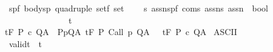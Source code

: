 \begin{isabellebody}
\ \ {\isachardoublequoteopen}{\isacharbrackleft}{\isacharparenleft}{\isacharprime}s{\isacharcomma}{\isacharprime}p{\isacharcomma}{\isacharprime}f{\isacharparenright}\ body{\isacharcomma}{\isacharparenleft}{\isacharprime}s{\isacharcomma}{\isacharprime}p{\isacharparenright}\ quadruple\ set{\isacharcomma}{\isacharprime}f\ set{\isacharcomma}\isanewline
\ \ \ \ {\isacharprime}s\ assn{\isacharcomma}{\isacharparenleft}{\isacharprime}s{\isacharcomma}{\isacharprime}p{\isacharcomma}{\isacharprime}f{\isacharparenright}\ com{\isacharcomma}{\isacharprime}s\ assn{\isacharcomma}{\isacharprime}s\ assn{\isacharbrackright}\ {\isasymRightarrow}\ bool{\isachardoublequoteclose}\isanewline
\ \ \ \ \ \ \ \ \ \ \ \ \ \ \ \ {\isacharparenleft}{\isachardoublequoteopen}{\isacharunderscore}{\isacharcomma}{\isacharunderscore}{\isasymTurnstile}\isactrlsub t\isactrlbsub {\isacharprime}{\isacharslash}{\isacharunderscore}\isactrlesub {\isacharslash}\ {\isacharunderscore}\ {\isacharunderscore}\ {\isacharunderscore}{\isacharcomma}{\isacharunderscore}{\isachardoublequoteclose}\ \ {\isacharbrackleft}{}{}{\isacharcomma}{}{}{\isacharcomma}\ {}{}{\isacharcomma}{}{}{}{}{\isacharcomma}\ {}{}{\isacharcomma}\ {}{}{}{}{\isacharcomma}{}{}{}{}{\isacharbrackright}\ {}{}{\isacharparenright}\isanewline
{}\isanewline
\ {\isachardoublequoteopen}{\isasymGamma}{\isacharcomma}{\isasymTheta}{\isasymTurnstile}\isactrlsub t\isactrlbsub {\isacharslash}F\isactrlesub \ P\ c\ Q{\isacharcomma}A\ {\isasymequiv}\ {\isacharparenleft}{\isasymforall}{\isacharparenleft}P{\isacharcomma}p{\isacharcomma}Q{\isacharcomma}A{\isacharparenright}{\isasymin}{\isasymTheta}{\isachardot}\ {\isasymGamma}{\isasymTurnstile}\isactrlsub t\isactrlbsub {\isacharslash}F\isactrlesub \ P\ {\isacharparenleft}Call\ p{\isacharparenright}\ Q{\isacharcomma}A{\isacharparenright}\ {\isasymlongrightarrow}\ {\isasymGamma}\ {\isasymTurnstile}\isactrlsub t\isactrlbsub {\isacharslash}F\isactrlesub \ P\ c\ Q{\isacharcomma}A{\isachardoublequoteclose}\isanewline
\isanewline
\isanewline
\isanewline
{}\isamarkupfalse%
\ {\isacharparenleft}ASCII{\isacharparenright}\isanewline
\ \ validt\ \ {\isacharparenleft}{\isachardoublequoteopen}{\isacharunderscore}{\isacharbar}{\isacharequal}t{\isacharprime}{\isacharslash}{\isacharunderscore}{\isacharslash}\ {\isacharunderscore}\ {\isacharunderscore}\ {\isacharunderscore}{\isacharcomma}{\isacharunderscore}{\isachardoublequoteclose}\ \ {\isacharbrackleft}{}{}{\isacharcomma}{}{}{\isacharcomma}{}{}{}{}{\isacharcomma}\ {}{}{\isacharcomma}\ {}{}{}{}{\isacharcomma}{}{}{}{}{\isacharbrackright}\ {}{}{\isacharparenright}\ \isanewline

\end{isabellebody}

